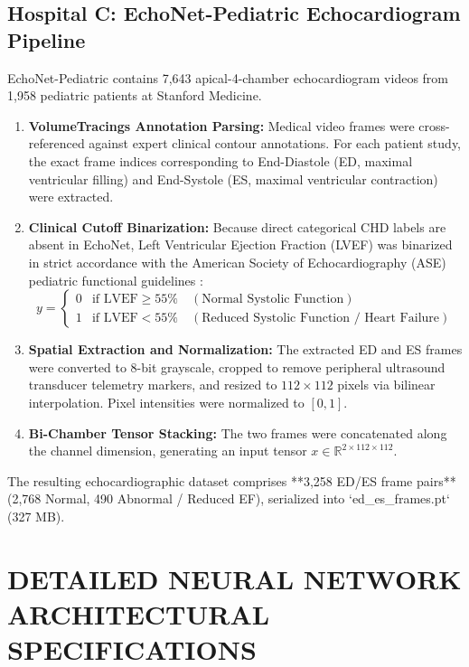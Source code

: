 \documentclass[12pt,a4paper]{amritareport}
\begin{document}
\subsection{Hospital C: EchoNet-Pediatric Echocardiogram Pipeline}
EchoNet-Pediatric \cite{he2023echonet} contains 7,643 apical-4-chamber echocardiogram videos from 1,958 pediatric patients at Stanford Medicine.
\begin{enumerate}
	\item \textbf{VolumeTracings Annotation Parsing:} Medical video frames were cross-referenced against expert clinical contour annotations. For each patient study, the exact frame indices corresponding to End-Diastole (ED, maximal ventricular filling) and End-Systole (ES, maximal ventricular contraction) were extracted.
	\item \textbf{Clinical Cutoff Binarization:} Because direct categorical CHD labels are absent in EchoNet, Left Ventricular Ejection Fraction (LVEF) was binarized in strict accordance with the American Society of Echocardiography (ASE) pediatric functional guidelines \cite{lopez2010recommendations}:
	\begin{equation}
		y = \begin{cases} 
			0 & \text{if } \text{LVEF} \geq 55\% \quad (\text{Normal Systolic Function}) \\ 
			1 & \text{if } \text{LVEF} < 55\% \quad (\text{Reduced Systolic Function / Heart Failure}) 
		\end{cases}
	\end{equation}
	\item \textbf{Spatial Extraction and Normalization:} The extracted ED and ES frames were converted to 8-bit grayscale, cropped to remove peripheral ultrasound transducer telemetry markers, and resized to $112 \times 112$ pixels via bilinear interpolation. Pixel intensities were normalized to $[0, 1]$.
	\item \textbf{Bi-Chamber Tensor Stacking:} The two frames were concatenated along the channel dimension, generating an input tensor $x \in \mathbb{R}^{2 \times 112 \times 112}$.
\end{enumerate}
The resulting echocardiographic dataset comprises **3,258 ED/ES frame pairs** (2,768 Normal, 490 Abnormal / Reduced EF), serialized into `ed_es_frames.pt` (327 MB).


\section{DETAILED NEURAL NETWORK ARCHITECTURAL SPECIFICATIONS}
\end{document}
